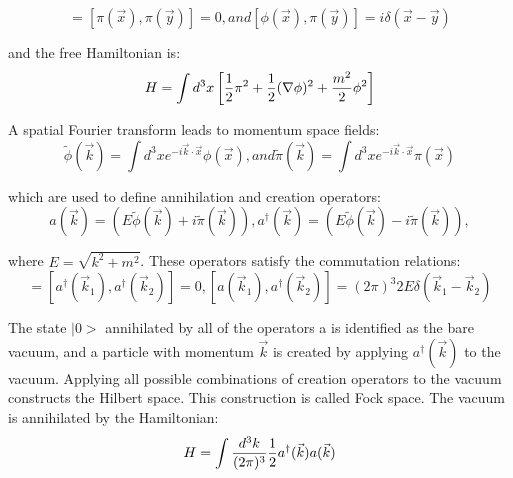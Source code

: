 \begin{equation}
    [\phi(\vec{x}),\phi(\vec{y})]=[\pi(\vec{x}),\pi(\vec{y})]=0 , and [\phi(\vec{x}),\pi(\vec{y})]=i \delta(\vec{x}-\vec{y})
\end{equation}

and the free Hamiltonian is:\\

\begin{equation}
    H=\int d^3x \left[{1\over 2}\pi^2+{1\over 2}(\nabla \phi)^2+{m^2\over 2}\phi^2\right]
\end{equation}

A spatial Fourier transform leads to momentum space fields:\\

\begin{equation}
    \tilde{\phi}(\vec{k})=\int d^3x e^{-i\vec{k}\cdot\vec{x}}\phi(\vec{x}) , and \tilde{\pi}(\vec{k})=\int d^3x e^{-i\vec{k}\cdot\vec{x}}\pi(\vec{x})
\end{equation}

which are used to define annihilation and creation operators:\\

\begin{equation}
    a(\vec{k})=\left(E\tilde{\phi}(\vec{k})+i\tilde{\pi}(\vec{k})\right) , a^\dagger(\vec{k})=\left(E\tilde{\phi}(\vec{k})-i\tilde{\pi}(\vec{k})\right),
\end{equation}

where $E=\sqrt{k^2+m^2}$. These operators satisfy the commutation relations:\\

\begin{equation}
    [a(\vec{k}_1),a(\vec{k}_2)]=[a^\dagger(\vec{k}_1),a^\dagger(\vec{k}_2)]=0 , [a(\vec{k}_1),a^\dagger(\vec{k}_2)]=(2\pi)^3 2E \delta(\vec{k}_1-\vec{k}_2)
\end{equation}

The state $|0>$ annihilated by all of the operators a is identified as the bare vacuum, and a particle with momentum $\vec{k}$ is created by applying $a^\dagger(\vec{k})$ to the vacuum. Applying all possible combinations of creation operators to the vacuum constructs the Hilbert space. This construction is called Fock space. The vacuum is annihilated by the Hamiltonian:\\

\begin{equation}
    H=\int {d^3k\over (2\pi)^3}\frac{1}{2} a^\dagger(\vec{k}) a(\vec{k})  
\end{equation}

